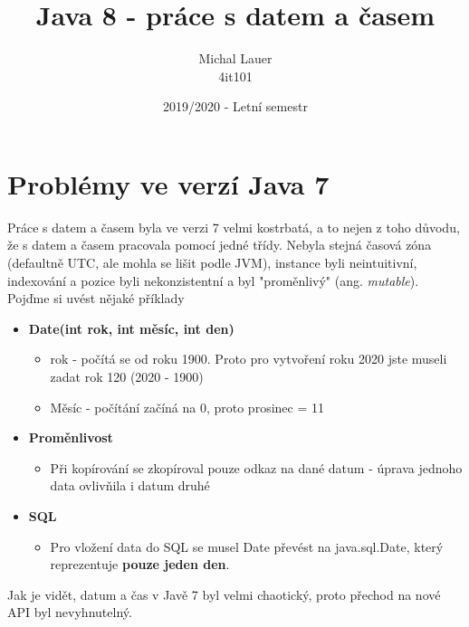 \documentclass[11pt,a4paper,titlepage]{article}
\title{Java 8 - práce s datem a časem}
\author{Michal Lauer\\4it101}
\date{\small{2019/2020 - Letní semestr}}
\begin{document}
\maketitle
\tableofcontents
\newpage
{}

\section{Problémy ve verzí Java 7}
Práce s datem a časem byla ve verzi 7 velmi kostrbatá, a to nejen z toho důvodu, že s datem a časem pracovala pomocí jedné třídy. Nebyla stejná časová zóna (defaultně UTC, ale mohla se lišit podle JVM), instance byli neintuitivní, indexování a pozice byli nekonzistentní a byl "proměnlivý" (ang. \textit{mutable}). Pojďme si uvést nějaké příklady
\begin{itemize}
    \item \textbf{Date(int rok, int měsíc, int den)}
    \begin{itemize}
        \item rok - počítá se od roku 1900. Proto pro vytvoření roku 2020 jste museli zadat rok 120 (2020 - 1900)
        \item Měsíc - počítání začíná na 0, proto prosinec = 11
    \end{itemize}
    \item \textbf{Proměnlivost}
    \begin{itemize}
        \item Při kopírování se zkopíroval pouze odkaz na dané datum - úprava jednoho data ovlivňila i datum druhé
    \end{itemize}
    \item \textbf{SQL}
    \begin{itemize}
        \item Pro vložení data do SQL se musel Date převést na java.sql.Date, který reprezentuje \textbf{pouze jeden den}.
    \end{itemize}

\end{itemize}
Jak je vidět, datum a čas v Javě 7 byl velmi chaotický, proto přechod na nové API byl nevyhnutelný.
\parencite{java7_date}
\end{document}
